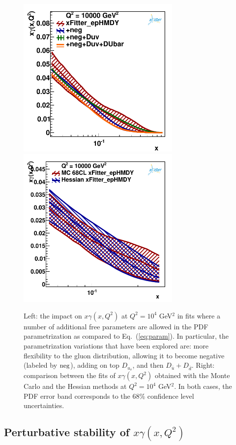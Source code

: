 \begin{figure}[t]
\centering
\includegraphics[width=8cm]{figs/q2_10000_pdf_ph_param_var.pdf}
\includegraphics[width=8cm]{figs/photon_mc_vs_hessian} 
\caption{Left: the impact on $x\gamma(x,Q^2)$ at $Q^2=10^4$ GeV$^2$
  in fits where a number of additional free parameters are allowed
  in the PDF parametrization as compared to Eq.~(\ref{eq:param}).
  In particular, the parametrization variations that have been explored
  are: more flexibility to the gluon distribution, allowing
  it to become negative
 (labeled by ${\rm neg}$), adding on top $D_{u_v}$, and then $D_{\bar{u}}+D_{\bar{d}}$.
 Right: comparison between the fits of $x\gamma(x,Q^2)$ obtained with the
  Monte Carlo and the Hessian methods at $Q^2=10^4$ GeV$^2$.
  In both cases, the PDF error band corresponds to the 68\% confidence
  level uncertainties.  }
\label{fig:param}
\label{fig:photon_mc_vs_hessian}
\end{figure}

\subsection{Perturbative stability of $x\gamma(x,Q^2)$}

